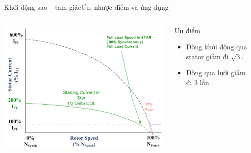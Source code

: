 \documentclass[17pt]{beamer}
\begin{document}
\begin{frame}{Khởi động sao -- tam giác}{Ưu, nhược điểm và ứng dụng}
\begin{columns}

\vspace{-1.5cm}
\begin{center}
\includegraphics[scale=.4]{images-chude1/dongdien-sao.png} 
\end{center}
\begin{small}	
\begin{block}{Ưu điểm}
\begin{itemize}
\item Dòng khởi động qua stator giảm đi $\sqrt{3}$.
\item Dòng qua lưới giảm đi $3$ lần.
\end{itemize}
\end{block}			
\end{small}
\end{columns}
\end{frame}
\end{document}
